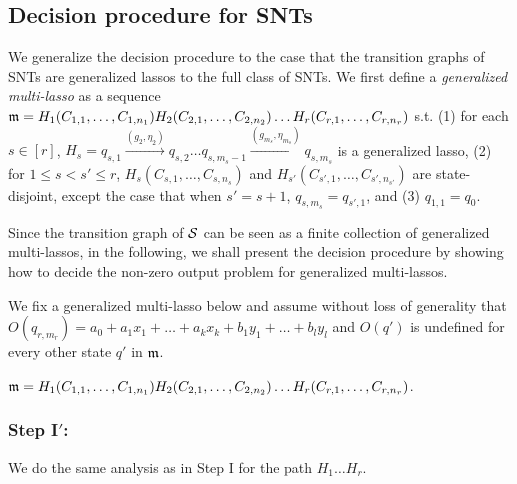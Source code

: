 
\vspace{-2mm}
\subsection{Decision procedure for SNTs}\label{sec-gflat}
\vspace{-1mm}

We generalize the decision procedure to the case that the transition graphs of SNTs are generalized lassos to the full class of SNTs.
We first define a \emph{generalized multi-lasso} as a sequence $\mathfrak{m}= H_1 (C_{1,1},\dots,C_{1,n_1}) H_2 (C_{2,1},\dots,C_{2,n_2}) \dots H_r (C_{r,1},\dots, C_{r, n_r})$ s.t. (1) for each $s\in[r]$, $H_s=q_{s,1} \xrightarrow{(g_2,\eta_2)} q_{s,2} \dots q_{s,m_s-1} \xrightarrow{(g_{m_s},\eta_{m_s})} q_{s,m_s}$ is a generalized lasso, (2) for $1 \leq s< s' \leq r$, $H_s (C_{s,1},\dots,C_{s, n_s})$ and $H_{s'} (C_{s', 1},\dots,C_{s', n_{s'}})$ are state-disjoint, except the case that when $s'=s+1$, $q_{s, m_s}=q_{s',1}$, and (3) $q_{1,1}=q_0$.

Since the transition graph of ${\mathcal{S} }$ can be seen as a finite collection of generalized multi-lassos, in the following, we shall present the decision procedure by showing how to decide the non-zero output problem for generalized multi-lassos. 

We fix a generalized multi-lasso below and assume without loss of generality that $O(q_{r,m_r})=a_0+a_1 x_1 + \dots + a_k x_k + b_1 y_1  + \dots + b_l y_l$ and $O(q')$ is undefined for every other state $q'$ in $\mathfrak{m}$.

\smallskip
\hspace{8mm} $\mathfrak{m}= H_1 (C_{1,1},\dots,C_{1,n_1}) H_2 (C_{2,1},\dots,C_{2,n_2}) \dots H_r (C_{r,1},\dots, C_{r, n_r})$.

\subsubsection{Step I$'$:} We do the same analysis as in Step I for the path $H_1\dots H_r$.


\vspace{-3mm}
